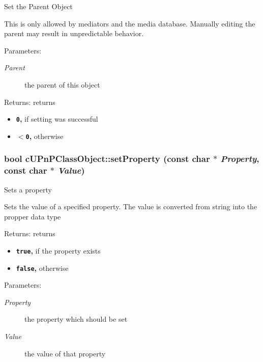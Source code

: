 Set the Parent Object

This is only allowed by mediators and the media database. Manually editing the parent may result in unpredictable behavior.

\begin{Desc}
\item[Parameters:]
\begin{description}
\item[{\em Parent}]the parent of this object \end{description}
\end{Desc}
\begin{Desc}
\item[Returns:]returns\begin{itemize}
\item {\bf {\tt 0},} if setting was successful\item {\bf {\tt $<$0},} otherwise \end{itemize}
\end{Desc}
\hypertarget{classcUPnPClassObject_6f2a803a0d0e148133edce23ed6c0e7c}{
\subsubsection[{setProperty}]{\setlength{\rightskip}{0pt plus 5cm}bool cUPnPClassObject::setProperty (const char $\ast$ {\em Property}, \/  const char $\ast$ {\em Value})}}
\label{classcUPnPClassObject_6f2a803a0d0e148133edce23ed6c0e7c}


Sets a property

Sets the value of a specified property. The value is converted from string into the propper data type

\begin{Desc}
\item[Returns:]returns\begin{itemize}
\item {\bf {\tt true},} if the property exists\item {\bf {\tt false},} otherwise \end{itemize}
\end{Desc}
\begin{Desc}
\item[Parameters:]
\begin{description}
\item[{\em Property}]the property which should be set \item[{\em Value}]the value of that property \end{description}
\end{Desc}


